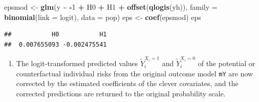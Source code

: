\documentclass[
]{book}
\newenvironment{Shaded}{\begin{snugshade}}{\end{snugshade}}
\newcommand{\AttributeTok}[1]{\textcolor[rgb]{0.13,0.29,0.53}{#1}}
\newcommand{\DecValTok}[1]{\textcolor[rgb]{0.00,0.00,0.81}{#1}}
\newcommand{\FunctionTok}[1]{\textcolor[rgb]{0.13,0.29,0.53}{\textbf{#1}}}
\newcommand{\NormalTok}[1]{#1}
\newcommand{\OtherTok}[1]{\textcolor[rgb]{0.56,0.35,0.01}{#1}}
\newcommand{\SpecialCharTok}[1]{\textcolor[rgb]{0.81,0.36,0.00}{\textbf{#1}}}
\providecommand{\tightlist}{%
  \setlength{\itemsep}{0pt}\setlength{\parskip}{0pt}}
\theoremstyle{definition}
\theoremstyle{definition}
\theoremstyle{definition}
\theoremstyle{definition}
\theoremstyle{remark}
\begin{document}
\begin{Shaded}
\begin{Highlighting}[]
\NormalTok{epsmod }\OtherTok{\textless{}{-}} \FunctionTok{glm}\NormalTok{(y }\SpecialCharTok{\textasciitilde{}} \SpecialCharTok{{-}}\DecValTok{1} \SpecialCharTok{+}\NormalTok{ H0 }\SpecialCharTok{+}\NormalTok{ H1 }\SpecialCharTok{+} \FunctionTok{offset}\NormalTok{(}\FunctionTok{qlogis}\NormalTok{(yh)),}
  \AttributeTok{family =} \FunctionTok{binomial}\NormalTok{(}\AttributeTok{link =}\NormalTok{ logit), }\AttributeTok{data =}\NormalTok{ pop)}
\NormalTok{eps }\OtherTok{\textless{}{-}} \FunctionTok{coef}\NormalTok{(epsmod)}
\NormalTok{eps}
\end{Highlighting}
\end{Shaded}

\begin{verbatim}
##           H0           H1 
##  0.007655093 -0.002475541
\end{verbatim}

\begin{enumerate}
\def\labelenumi{\arabic{enumi}.}
\setcounter{enumi}{2}
\tightlist
\item
  The logit-transformed predicted values \(\widetilde{Y}_i^{X_i=1}\) and
  \(\widetilde{Y}_i^{X_i=0}\) of the potential or counterfactual
  individual risks from the original outcome model \texttt{mY} are now
  corrected by the estimated coefficients of the clever covariates,
  and the corrected predictions are returned to the original
  probability scale.
\end{enumerate}

\begin{Shaded}
\end{Shaded}
\end{document}
